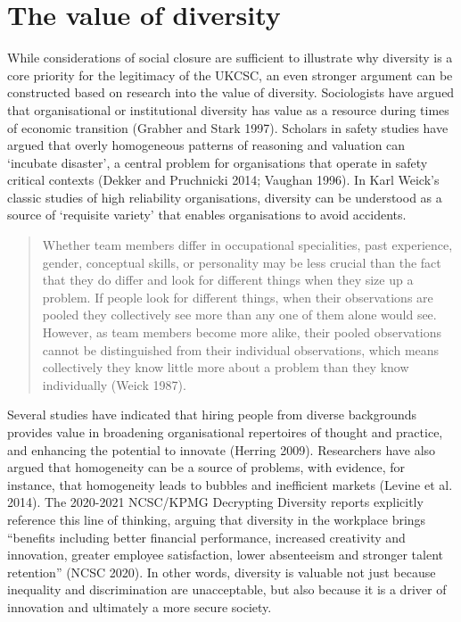 \documentclass[
  a4paper,
]{book}
\begin{document}
\section{The value of diversity}\label{the-value-of-diversity}

While considerations of social closure are sufficient to illustrate why
diversity is a core priority for the legitimacy of the UKCSC, an even
stronger argument can be constructed based on research into the value of
diversity. Sociologists have argued that organisational or institutional
diversity has value as a resource during times of economic transition
(Grabher and Stark 1997). Scholars in safety studies have argued that
overly homogeneous patterns of reasoning and valuation can `incubate
disaster', a central problem for organisations that operate in safety
critical contexts (Dekker and Pruchnicki 2014; Vaughan 1996). In Karl
Weick's classic studies of high reliability organisations, diversity can
be understood as a source of `requisite variety' that enables
organisations to avoid accidents.

\begin{quote}
Whether team members differ in occupational specialities, past
experience, gender, conceptual skills, or personality may be less
crucial than the fact that they do differ and look for different things
when they size up a problem. If people look for different things, when
their observations are pooled they collectively see more than any one of
them alone would see. However, as team members become more alike, their
pooled observations cannot be distinguished from their individual
observations, which means collectively they know little more about a
problem than they know individually (Weick 1987).
\end{quote}

Several studies have indicated that hiring people from diverse
backgrounds provides value in broadening organisational repertoires of
thought and practice, and enhancing the potential to innovate (Herring
2009). Researchers have also argued that homogeneity can be a source of
problems, with evidence, for instance, that homogeneity leads to bubbles
and inefficient markets (Levine et al. 2014). The 2020-2021 NCSC/KPMG
Decrypting Diversity reports explicitly reference this line of thinking,
arguing that diversity in the workplace brings ``benefits including
better financial performance, increased creativity and innovation,
greater employee satisfaction, lower absenteeism and stronger talent
retention'' (NCSC 2020). In other words, diversity is valuable not just
because inequality and discrimination are unacceptable, but also because
it is a driver of innovation and ultimately a more secure society.
\end{document}

